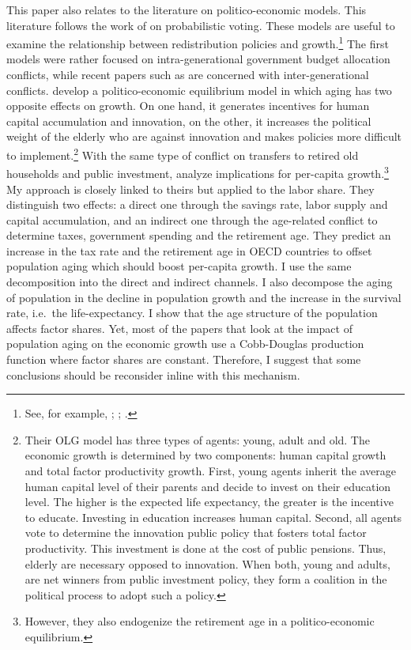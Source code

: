 \documentclass[
]{article}
\begin{document}
This paper also relates to the literature on politico-economic models. This literature follows the work of \citet{Lindbeck1987} on probabilistic voting. These models are useful to examine the relationship between redistribution policies and growth.\footnote{See, for example, \citet{Alesina1994}; \citet{Persson1994}; \citet{Krusell1997}.} The first models were rather focused on intra-generational government budget allocation conflicts, while recent papers such as \citet{Lancia2012} are concerned with inter-generational conflicts. \citet{Lancia2012} develop a politico-economic equilibrium model in which aging has two opposite effects on growth. On one hand, it generates incentives for human capital accumulation and innovation, on the other, it increases the political weight of the elderly who are against innovation and makes policies more difficult to implement.\footnote{Their OLG model has three types of agents: young, adult and old. The economic growth is determined by two components: human capital growth and total factor productivity growth. First, young agents inherit the average human capital level of their parents and decide to invest on their education level. The higher is the expected life expectancy, the greater is the incentive to educate. Investing in education increases human capital. Second, all agents vote to determine the innovation public policy that fosters total factor productivity. This investment is done at the cost of public pensions. Thus, elderly are necessary opposed to innovation. When both, young and adults, are net winners from public investment policy, they form a coalition in the political process to adopt such a policy.}
With the same type of conflict on transfers to retired old households and public investment, \citet{Gonzalez-Eiras2012} analyze implications for per-capita growth.\footnote{However, they also endogenize the retirement age in a politico-economic equilibrium.} My approach is closely linked to theirs but applied to the labor share. They distinguish two effects: a direct one through the savings rate, labor supply and capital accumulation, and an indirect one through the age-related conflict to determine taxes, government spending and the retirement age. They predict an increase in the tax rate and the retirement age in OECD countries to offset population aging which should boost per-capita growth. I use the same decomposition into the direct and indirect channels. I also decompose the aging of population in the decline in population growth and the increase in the survival rate, i.e.~the life-expectancy.
I show that the age structure of the population affects factor shares. Yet, most of the papers that look at the impact of population aging on the economic growth use a Cobb-Douglas production function where factor shares are constant. Therefore, I suggest that some conclusions should be reconsider inline with this mechanism.
\end{document}
